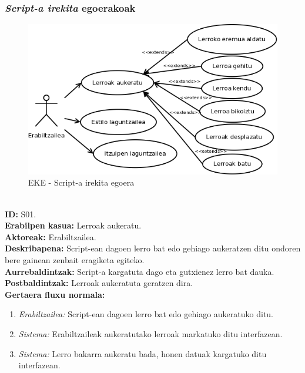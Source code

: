 \subsubsection{\textit{Script-a irekita} egoerakoak}
\begin{figure}[htp]
\begin{center}
\includegraphics[scale=0.4]{Pictures/Chapter4/Analisia/EKE-Script.png}
\caption{EKE - Script-a irekita egoera}
\label{eke-script}
\end{center}
\end{figure}
\noindent\\
\textbf{ID:} S01.\\
\textbf{Erabilpen kasua:} Lerroak aukeratu.\\
\textbf{Aktoreak:} Erabiltzailea.\\
\textbf{Deskribapena:} Script-ean dagoen lerro bat edo gehiago aukeratzen ditu ondoren bere gainean zenbait eragiketa egiteko.\\
\textbf{Aurrebaldintzak:}  Script-a kargatuta dago eta gutxienez lerro bat dauka.\\
\textbf{Postbaldintzak:} Lerroak aukeratuta geratzen dira.\\
\textbf{Gertaera fluxu normala:}
\begin{enumerate}
	\item \textit{Erabiltzailea:} Script-ean dagoen lerro bat edo gehiago aukeratuko ditu.
	\item \textit{Sistema:} Erabiltzaileak aukeratutako lerroak markatuko ditu interfazean.
	\item \textit{Sistema:} Lerro bakarra aukeratu bada, honen datuak kargatuko ditu interfazean.
\end{enumerate}
